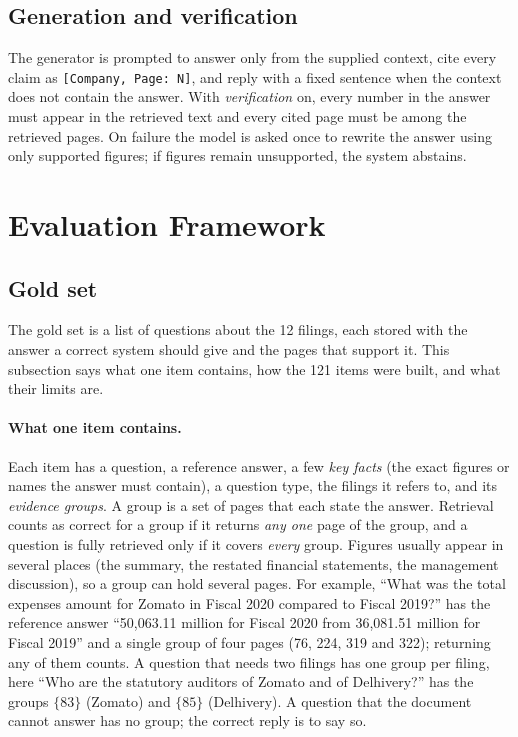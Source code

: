 \documentclass[11pt,a4paper]{article}
\begin{document}
\subsection{Generation and verification}
The generator is prompted to answer only from the supplied context, cite every claim as \texttt{[Company, Page: N]}, and reply with a fixed sentence when the context does not contain the answer. With \emph{verification} on, every number in the answer must appear in the retrieved text and every cited page must be among the retrieved pages. On failure the model is asked once to rewrite the answer using only supported figures; if figures remain unsupported, the system abstains.

\section{Evaluation Framework}
\subsection{Gold set}
The gold set is a list of questions about the 12 filings, each stored with the answer a correct system should give and the pages that support it. This subsection says what one item contains, how the 121 items were built, and what their limits are.

\paragraph{What one item contains.} Each item has a question, a reference answer, a few \emph{key facts} (the exact figures or names the answer must contain), a question type, the filings it refers to, and its \emph{evidence groups}. A group is a set of pages that each state the answer. Retrieval counts as correct for a group if it returns \emph{any one} page of the group, and a question is fully retrieved only if it covers \emph{every} group. Figures usually appear in several places (the summary, the restated financial statements, the management discussion), so a group can hold several pages. For example, ``What was the total expenses amount for Zomato in Fiscal 2020 compared to Fiscal 2019?'' has the reference answer ``50,063.11 million for Fiscal 2020 from 36,081.51 million for Fiscal 2019'' and a single group of four pages (76, 224, 319 and 322); returning any of them counts. A question that needs two filings has one group per filing, here ``Who are the statutory auditors of Zomato and of Delhivery?'' has the groups $\{83\}$ (Zomato) and $\{85\}$ (Delhivery). A question that the document cannot answer has no group; the correct reply is to say so.
\end{document}
